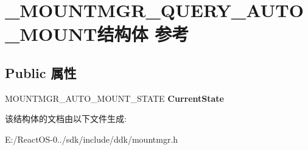 \hypertarget{struct___m_o_u_n_t_m_g_r___q_u_e_r_y___a_u_t_o___m_o_u_n_t}{}\section{\+\_\+\+M\+O\+U\+N\+T\+M\+G\+R\+\_\+\+Q\+U\+E\+R\+Y\+\_\+\+A\+U\+T\+O\+\_\+\+M\+O\+U\+N\+T结构体 参考}
\label{struct___m_o_u_n_t_m_g_r___q_u_e_r_y___a_u_t_o___m_o_u_n_t}
\subsection*{Public 属性}
\begin{DoxyCompactItemize}
\item 
\mbox{\label{struct___m_o_u_n_t_m_g_r___q_u_e_r_y___a_u_t_o___m_o_u_n_t_a5bce50ae8d6dadac4f9de3032cd1d788}} 
M\+O\+U\+N\+T\+M\+G\+R\+\_\+\+A\+U\+T\+O\+\_\+\+M\+O\+U\+N\+T\+\_\+\+S\+T\+A\+TE {\bfseries Current\+State}
\end{DoxyCompactItemize}


该结构体的文档由以下文件生成\+:\begin{DoxyCompactItemize}
\item 
E\+:/\+React\+O\+S-\/0../sdk/include/ddk/mountmgr.\+h\end{DoxyCompactItemize}

